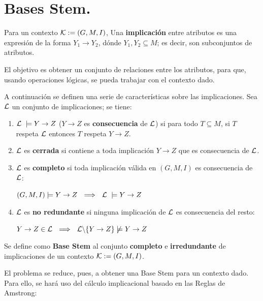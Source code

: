\section{Bases Stem.}

\begin{defi}
Para un contexto ${\cal K}:=(G,M,I)$, Una {\bf implicación} entre atributos es una expresión de la forma $Y_1 \rightarrow{Y_2}$, dónde $Y_1, Y_2 \subseteq M$; es decir, son subconjuntos de atributos.
\end{defi}

El objetivo es obtener un conjunto de relaciones entre los atributos, para que, usando operaciones lógicas, se pueda trabajar con el contexto dado.

A continuación se definen una serie de características sobre las implicaciones. Sea ${\cal L}$ un conjunto de implicaciones; se tiene:
\begin{enumerate}
	\item ${\cal L} \ \models Y \rightarrow{Z}$ ($Y \rightarrow{Z}$ es {\bf consecuencia} de ${\cal L}$) si para todo $T \subseteq M$, si $T$ respeta ${\cal L}$ entonces $T$ respeta $Y \rightarrow{Z}$.
	\item ${\cal L}$ es {\bf cerrada} si contiene a toda implicación $Y \rightarrow{Z}$ que es consecuencia de ${\cal L}$.
	\item ${\cal L}$ es {\bf completo} si toda implicación válida en $(G,M,I)$ es consecuencia de ${\cal L}$:
	\begin{center}
		$(G,M,I) \models Y \rightarrow{Z}\ \ \Longrightarrow{\ \  {\cal L} \ \models Y \rightarrow{Z} }$
	\end{center}
	\item ${\cal L}$ es {\bf no redundante} si ninguna implicación de ${\cal L}$ es consecuencia del resto:
	\begin{center}
		$Y \rightarrow{Z} \in{{\cal L}}\ \ \Longrightarrow{\ \  {\cal L} \backslash \{ Y \rightarrow{Z}\} \not\models Y \rightarrow{Z} }$
	\end{center}
\end{enumerate}

\begin{defi}
	Se define como {\bf Base Stem} al conjunto {\bf completo} e {\bf irredundante} de implicaciones de un contexto ${\cal K}:=(G,M,I)$.
\end{defi}

El problema se reduce, pues, a obtener una Base Stem para un contexto dado. Para ello, se hará uso del cálculo implicacional basado en las Reglas de Amstrong:


